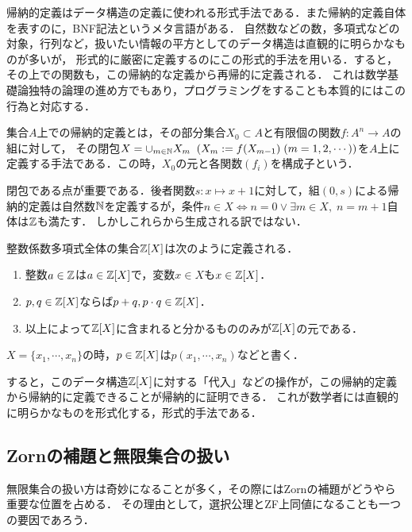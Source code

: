 \documentclass[uplatex, 12pt, dvipdfmx]{jsreport}
\begin{document}
\begin{screen}
    帰納的定義はデータ構造の定義に使われる形式手法である．また帰納的定義自体を表すのに，BNF記法というメタ言語がある．
    自然数などの数，多項式などの対象，行列など，扱いたい情報の平方としてのデータ構造は直観的に明らかなものが多いが，
    形式的に厳密に定義するのにこの形式的手法を用いる．すると，その上での関数も，この帰納的な定義から再帰的に定義される．
    これは数学基礎論独特の論理の進め方でもあり，プログラミングをすることも本質的にはこの行為と対応する．
\end{screen}

\begin{definition}
    集合$A$上での帰納的定義とは，その部分集合$X_0\subset A$と有限個の関数$f:A^n\to A$の組に対して，
    その閉包$X=\cup_{m\in\mathbb{N}}X_m\;\;(X_m:=f(X_{m-1})\;(m=1,2,\cdots))$を$A$上に定義する手法である．この時，$X_0$の元と各関数$(f_i)$を構成子という．
\end{definition}
\begin{remark}
    閉包である点が重要である．後者関数$s:x\mapsto x+1$に対して，組$(0,s)$による帰納的定義は自然数$\mathbb{N}$を定義するが，条件$n\in X\Leftrightarrow n=0\lor\exists m\in X,\; n=m+1$自体は$\mathbb{Z}$も満たす．
    しかしこれらから生成される訳ではない．
\end{remark}
\begin{remark}[多項式]
    整数係数多項式全体の集合$\mathbb{Z}[X]$は次のように定義される．
    \begin{enumerate}
        \item 整数$a\in\mathbb{Z}$は$a\in\mathbb{Z}[X]$で，変数$x\in X$も$x\in\mathbb{Z}[X]$．
        \item $p,q\in\mathbb{Z}[X]$ならば$p+q,p\cdot q\in\mathbb{Z}[X]$．
        \item 以上によって$\mathbb{Z}[X]$に含まれると分かるもののみが$\mathbb{Z}[X]$の元である．
    \end{enumerate}
    $X=\{x_1,\cdots,x_n\}$の時，$p\in\mathbb{Z}[X]$は$p(x_1,\cdots,x_n)$などと書く．

    すると，このデータ構造$\mathbb{Z}[X]$に対する「代入」などの操作が，この帰納的定義から帰納的に定義できることが帰納的に証明できる．
    これが数学者には直観的に明らかなものを形式化する，形式的手法である．
\end{remark}

\subsection{Zornの補題と無限集合の扱い}

無限集合の扱い方は奇妙になることが多く，その際にはZornの補題がどうやら重要な位置を占める．
その理由として，選択公理とZF上同値になることも一つの要因であろう．
\end{document}
